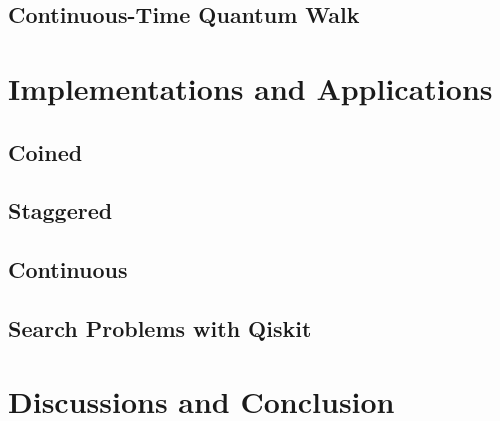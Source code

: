 \documentclass[
oneside,
11pt, a4paper,
footinclude=true,
headinclude=true,
cleardoublepage=empty
]{scrbook}
\begin{document}
\section{Continuous-Time Quantum Walk}\label{sec:ContSearchSimul}



\chapter{Implementations and Applications}\label{chap:qiskitImplementation}
\section{Coined}\label{coinedQWQiskit}
\label{sec:CoinedQiskit}
\section{Staggered}
\label{sec:StagQiskit}
\section{Continuous}
\label{sec:ContQiskit}
\section{Search Problems with Qiskit}


\chapter{Discussions and Conclusion}
\end{document}
